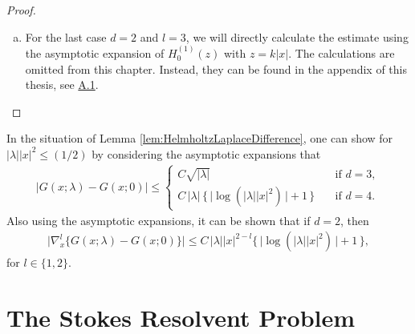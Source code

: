 \begin{proof}
\begin{enumerate}[(a)]
  \item For the last case $d = 2$ and $l = 3$, we will directly calculate the estimate using the asymptotic expansion of $H_0^{(1)}(z)$ with $z = k|x|$. The calculations are omitted from this chapter. Instead, they can be found in the appendix of this thesis, see \hyperref[sec:A1]{A.1}. \qedhere
%
  \end{enumerate} 
\end{proof}

\begin{rem}
  \label{rem:HelmholtzLaplaceDifference}
  In the situation of Lemma \ref{lem:HelmholtzLaplaceDifference}, one can show for $|\lambda| |x|^2 \leq (1/2)$ by considering the asymptotic expansions that 
  \begin{align*}
    |G(x; \lambda) - G(x; 0) | \leq \begin{cases}
      C \sqrt{|\lambda|} \quad&\text{if } d = 3, \\
      C\, |\lambda| \,\Big\{\, \big|\log(|\lambda| |x|^2) \,\big| + 1 \,\Big\} \quad&\text{if } d = 4.
    \end{cases}
  \end{align*}
  Also using the asymptotic expansions, it can be shown that if $d = 2$, then
  \begin{align*}
    \big|\nabla_x^l \{ G(x; \lambda) - G(x; 0) \} \big| \leq C\, |\lambda| |x|^{2 - l} \Big\{\, \big|\log(|\lambda| |x|^2 ) \,\big| + 1\, \Big\},
  \end{align*}
  for $l \in \{1, 2\}$.  
\end{rem}

\section{The Stokes Resolvent Problem}
\label{sec:2.2}

